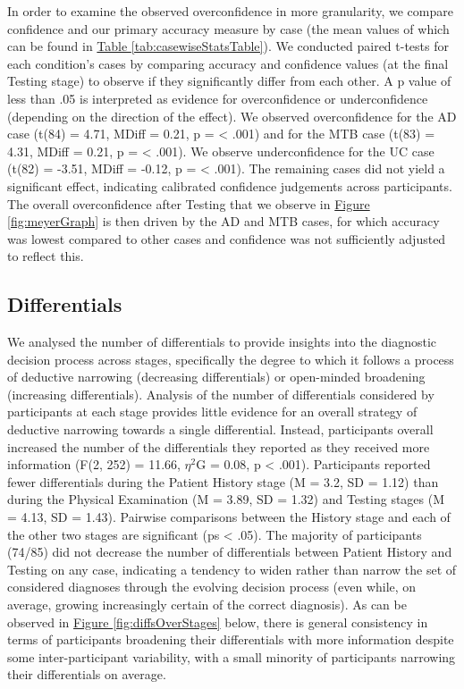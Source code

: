 \documentclass[a4paper, nobind]{templates/ociamthesis}
\begin{document}
In order to examine the observed overconfidence in more granularity, we compare confidence and our primary accuracy measure by case (the mean values of which can be found in \hyperref[tab:casewiseStatsTable]{Table \ref{tab:casewiseStatsTable}}). We conducted paired t-tests for each condition's cases by comparing accuracy and confidence values (at the final Testing stage) to observe if they significantly differ from each other. A p value of less than .05 is interpreted as evidence for overconfidence or underconfidence (depending on the direction of the effect). We observed overconfidence for the AD case (t(84) = 4.71, MDiff = 0.21, p = \textless{} .001) and for the MTB case (t(83) = 4.31, MDiff = 0.21, p = \textless{} .001). We observe underconfidence for the UC case (t(82) = -3.51, MDiff = -0.12, p = \textless{} .001). The remaining cases did not yield a significant effect, indicating calibrated confidence judgements across participants. The overall overconfidence after Testing that we observe in \hyperref[fig:meyerGraph]{Figure \ref{fig:meyerGraph}} is then driven by the AD and MTB cases, for which accuracy was lowest compared to other cases and confidence was not sufficiently adjusted to reflect this.

\subsection{Differentials}\label{differentials}

We analysed the number of differentials to provide insights into the diagnostic decision process across stages, specifically the degree to which it follows a process of deductive narrowing (decreasing differentials) or open-minded broadening (increasing differentials). Analysis of the number of differentials considered by participants at each stage provides little evidence for an overall strategy of deductive narrowing towards a single differential. Instead, participants overall increased the number of the differentials they reported as they received more information (F(2, 252) = 11.66, \(\eta^2\)G = 0.08, p \textless{} .001). Participants reported fewer differentials during the Patient History stage (M = 3.2, SD = 1.12) than during the Physical Examination (M = 3.89, SD = 1.32) and Testing stages (M = 4.13, SD = 1.43). Pairwise comparisons between the History stage and each of the other two stages are significant (ps \textless{} .05). The majority of participants (74/85) did not decrease the number of differentials between Patient History and Testing on any case, indicating a tendency to widen rather than narrow the set of considered diagnoses through the evolving decision process (even while, on average, growing increasingly certain of the correct diagnosis). As can be observed in \hyperref[fig:diffsOverStages]{Figure \ref{fig:diffsOverStages}} below, there is general consistency in terms of participants broadening their differentials with more information despite some inter-participant variability, with a small minority of participants narrowing their differentials on average.
\end{document}
